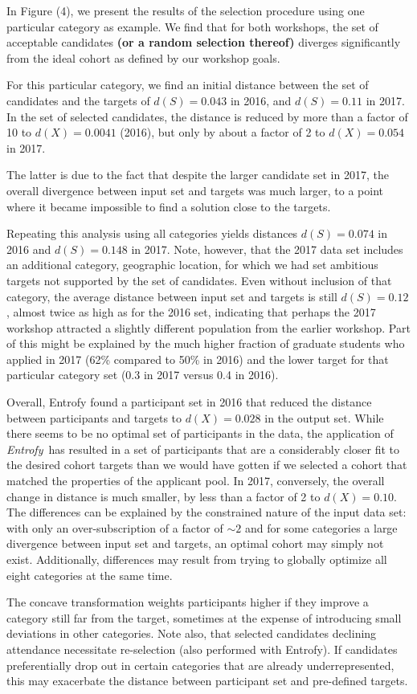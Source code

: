 \documentclass[12pt]{article}
\newcommand{\project}[1]{\textsl{#1}}
\newcommand{\entrofy}{\project{Entrofy}}
\begin{document}
In Figure (4), we present the results of the selection procedure using one particular category as example.
We find that for both workshops, the set of acceptable candidates \textbf{(or a random selection thereof)} diverges significantly from the ideal cohort as defined by our workshop goals.
\begin{bf}
For this particular category, we find an initial distance between the set of candidates and the targets of $d(S)=0.043$ in 2016, and $d(S)=0.11$ in 2017.
In the set of selected candidates, the distance is reduced by more than a factor of 10 to $d(X)=0.0041$ (2016), but only by about a factor of 2 to $d(X)=0.054$ in 2017.
\end{bf}
\begin{bf}
The latter is due to the fact that despite the larger candidate set in 2017, the overall divergence between input set and targets was much larger, to a point where it became impossible to find a solution close to the targets.
    
Repeating this analysis using all categories yields distances $d(S)=0.074$ in 2016 and $d(S)=0.148$ in 2017.
Note, however, that the 2017 data set includes an additional category, geographic location, for which we had set ambitious targets not supported by the set of candidates.
Even without inclusion of that category, the average distance between input set and targets is still $d(S)=0.12$, almost twice as high as for the 2016 set, indicating that perhaps the 2017 workshop attracted a slightly different population from the earlier workshop.
Part of this might be explained by the much higher fraction of graduate students who applied in 2017 (62\% compared to 50\% in 2016) and the lower target for that particular category set (0.3 in 2017 versus 0.4 in 2016).
    
Overall, Entrofy found a participant set in 2016 that reduced the distance between participants and targets to \textbf{$d(X)=0.028$} in the output set. While there seems to be no optimal set of participants in the data, the application of \entrofy\ has resulted in a set of participants that are a considerably closer fit to the desired cohort targets than we would have gotten if we selected a cohort that matched the properties of the applicant pool.
In 2017, conversely, the overall change in distance is much smaller, by less than a factor of 2 to $d(X)=0.10$.
The differences can be explained by the constrained nature of the input data set: with only an over-subscription of a factor of $\sim 2$ and for some categories a large divergence between input set and targets, an optimal cohort may simply not exist.
Additionally, differences may result from trying to globally optimize all eight categories at the same time.

The concave transformation weights participants higher if they improve a category still far from the target, sometimes at the expense of introducing small deviations in other categories.
Note also, that selected candidates declining attendance necessitate re-selection (also performed with Entrofy).
If candidates preferentially drop out in certain categories that are already underrepresented, this may exacerbate the distance between participant set and pre-defined targets.
\end{bf}
\end{document}
